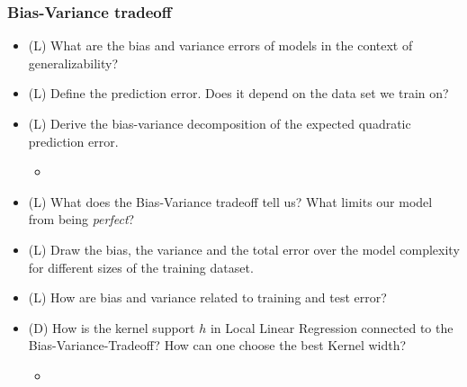 \subsubsection*{Bias-Variance tradeoff}
\begin{itemize}
    \item (L) What are the bias and variance errors of models in the context of generalizability?
    \answerboxM
    \item (L) Define the prediction error. Does it depend on the data set we train on?
    \answerboxM
    \item (L) Derive the bias-variance decomposition of the expected quadratic prediction error.
    \begin{itemize}
        \item {}
    \end{itemize}
    \answerboxL
    \item (L) What does the Bias-Variance tradeoff tell us? What limits our model from being \textit{perfect}?
    \answerboxM
    \item (L) Draw the bias, the variance and the total error over the model complexity for different sizes of the training dataset.
    \answerboxL
    \item (L) How are bias and variance related to training and test error?
    \answerboxM
    \item (D) How is the kernel support $h$ in Local Linear Regression connected to the Bias-Variance-Tradeoff? How can one choose the best Kernel width?
    \begin{itemize}
        \item {}
    \end{itemize}
    \answerboxM
\end{itemize}

